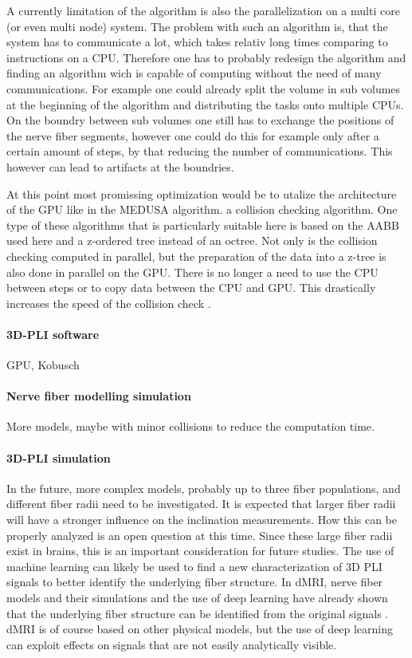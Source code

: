 \par
% 
A currently limitation of the algorithm is also the parallelization on a multi core (or even multi node) system.
The problem with such an algorithm is, that the system has to communicate a lot, which takes relativ long times comparing to instructions on a \ac{CPU}.
Therefore one has to probably redesign the algorithm and finding an algorithm wich is capable of computing without the need of many communications.
For example one could already split the volume in sub volumes at the beginning of the algorithm and distributing the tasks onto multiple \acp{CPU}.
On the boundry between sub volumes one still has to exchange the positions of the nerve fiber segments, however one could do this for example only after a certain amount of steps, by that reducing the number of communications.
This however can lead to artifacts at the boundries.
\par
% 
At this point most promissing optimization would be to utalize the architecture of the \ac{GPU} like in the \ac{MEDUSA} algorithm.
a collision checking algorithm.
One type of these algorithms that is particularly suitable here is based on the \ac{AABB} used here and a z-ordered tree instead of an octree.
Not only is the collision checking computed in parallel, but the preparation of the data into a z-tree is also done in parallel on the \ac{GPU}.
There is no longer a need to use the \ac{CPU} between steps or to copy data between the \ac{CPU} and \ac{GPU}.
This drastically increases the speed of the collision check \cite{Karras2012}. 
% 
% 
% 
\paragraph{\ac{3D-PLI} software}
% 
GPU, Kobusch
% 
\paragraph{Nerve fiber modelling simulation}
% 
More models, maybe with minor collisions to reduce the computation time.
% 
\paragraph{\ac{3D-PLI} simulation}
% 
In the future, more complex models, probably up to three fiber populations, and different fiber radii need to be investigated.
It is expected that larger fiber radii will have a stronger influence on the inclination measurements.
How this can be properly analyzed is an open question at this time.
Since these large fiber radii exist in brains, this is an important consideration for future studies.
The use of machine learning can likely be used to find a new characterization of 3D PLI signals to better identify the underlying fiber structure.
In \ac{dMRI}, nerve fiber models and their simulations and the use of deep learning have already shown that the underlying fiber structure can be identified from the original signals \cite{ginsburgerDis2019}.
\ac{dMRI} is of course based on other physical models, but the use of deep learning can exploit effects on signals that are not easily analytically visible.
% 
% 
% 
% 
% 

